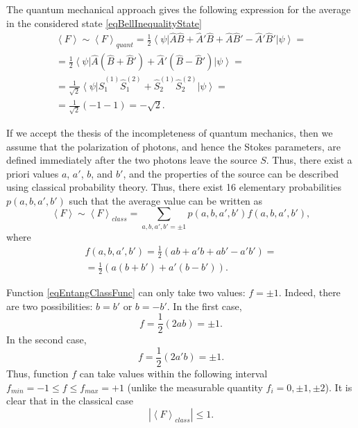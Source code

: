 The quantum mechanical approach gives the following expression for the average in
the considered state \eqref{eqBellInequalityState} 
\begin{eqnarray}
 \left<F\right> \sim \left<F\right>_{quant} 
=\frac{1}{2}
\left<\psi\right|
\hat{A}\hat{B} + \hat{A}'\hat{B} + \hat{A}\hat{B}' - \hat{A}'\hat{B}'
\left|\psi\right> = 
\nonumber \\
=\frac{1}{2}
\left<\psi\right|
\hat{A}\left(\hat{B} + \hat{B}'\right) + \hat{A}' \left(\hat{B}  -
\hat{B}' \right)
\left|\psi\right> = 
\nonumber \\
= \frac{1}{\sqrt{2}}
\left<\psi\right|
\hat{S}_1^{(1)}\hat{S}_1^{(2)} + \hat{S}_2^{(1)}\hat{S}_2^{(2)}
\left|\psi\right> =
\nonumber \\
= \frac{1}{\sqrt{2}}
\left(-1 - 1\right) = - \sqrt{2}.
\label{eqEntangQuant}
\end{eqnarray}

If we accept the thesis of the incompleteness of quantum mechanics, then we
assume that the polarization of photons, and hence the Stokes parameters,
are defined immediately after the two photons leave the source
$S$.  
Thus, there exist a priori values $a$, $a'$, $b$, and $b'$,
and the properties of the source can be described using
classical probability theory.
Thus, there exist 16 elementary
probabilities $p\left(a,b,a',b'\right)$ such that the average value can
be written as
\begin{equation}
 \left<F\right> \sim \left<F\right>_{class} 
=\sum_{a,b,a',b'=\pm 1} 
p\left(a,b,a',b'\right) f\left(a,b,a',b'\right),
\label{eqEntangClassFuncPre}
\end{equation}
where
\begin{eqnarray}
 f\left(a,b,a',b'\right) = \frac{1}{2} 
\left(
ab + a'b + ab' - a'b'
\right) = 
\nonumber \\
=
\frac{1}{2} 
\left(
a \left(b + b'\right) + a' \left(b - b'\right)
\right).
\label{eqEntangClassFunc}
\end{eqnarray}

Function \eqref{eqEntangClassFunc} can only take two values:
$f = \pm 1$. Indeed, there are two possibilities: $b = b'$
or $b = - b'$. In the first case,
\[
f = \frac{1}{2}\left(2ab\right) = \pm 1.
\]
In the second case,
\[
f = \frac{1}{2}\left(2a'b\right) = \pm 1.
\]
Thus, function $f$ can take values within the following
interval $f_{min} = -1 \le f \le f_{max} = +1$ (unlike the measurable quantity
$f_i = 0, \pm 1, \pm 2$). It is clear that in the classical case
\begin{equation}
\left|\left<F\right>_{class} \right| 
\le 1.
\label{eqEntangClass}
\end{equation}

